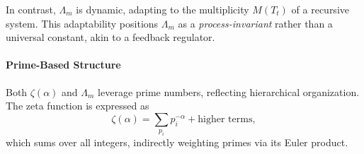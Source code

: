 \documentclass{article}
\theoremstyle{plain}
\theoremstyle{definition}
\theoremstyle{remark}
\begin{document}
In contrast, \(\Lambda_m\) is dynamic, adapting to the multiplicity \(M(T_t)\) of a recursive system. This adaptability positions \(\Lambda_m\) as a \textit{process-invariant} rather than a universal constant, akin to a feedback regulator.

\paragraph{Prime-Based Structure}
Both \(\zeta(\alpha)\) and \(\Lambda_m\) leverage prime numbers, reflecting hierarchical organization. The zeta function is expressed as
\begin{equation}
\zeta(\alpha) = \sum_{p_i} p_i^{-\alpha} + \text{higher terms},
\end{equation}
which sums over all integers, indirectly weighting primes via its Euler product. 
\end{document}
